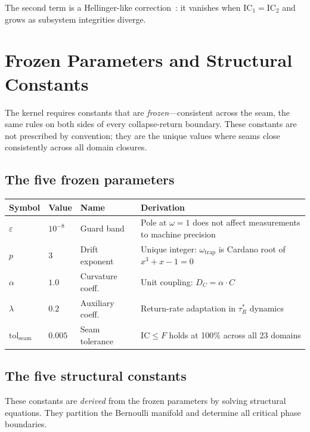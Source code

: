 \documentclass[
  aps,
  prd,
  twocolumn,
  superscriptaddress,
  nofootinbib,
  floatfix
]{revtex4-2}
\newcommand{\tRS}{\tau_{\!R}^{*}}
\newcommand{\eps}{\varepsilon}
\newcommand{\tolseam}{\mathrm{tol}_{\mathrm{seam}}}
\newcommand{\IC}{\mathrm{IC}}
\begin{document}
\noindent The second term is a Hellinger-like
correction~\cite{hellinger1909}: it vanishes when
$\IC_1 = \IC_2$ and grows as subsystem integrities diverge.


\section{Frozen Parameters and Structural Constants}
\label{sec:frozen}

The kernel requires constants that are \emph{frozen}---consistent
across the seam, the same rules on both sides of every
collapse-return boundary.  These constants are not prescribed by
convention; they are the unique values where seams close
consistently across all domain closures.

\subsection{The five frozen parameters}

\begin{center}
{\small\begin{tabular}{@{}lllp{3.2cm}@{}}
\toprule
\textbf{Symbol} & \textbf{Value} & \textbf{Name} & \textbf{Derivation} \\
\midrule
$\eps$ & $10^{-8}$ & Guard band & Pole at $\omega=1$ does not affect measurements to machine precision \\
$p$ & $3$ & Drift exponent & Unique integer: $\omega_{\mathrm{trap}}$ is Cardano root of $x^3+x-1=0$ \\
$\alpha$ & $1.0$ & Curvature coeff.\ & Unit coupling: $D_C = \alpha \cdot C$ \\
$\lambda$ & $0.2$ & Auxiliary coeff.\ & Return-rate adaptation in $\tRS$ dynamics \\
$\tolseam$ & $0.005$ & Seam tolerance & $\IC \leq F$ holds at 100\% across all 23 domains \\
\bottomrule
\end{tabular}}
\end{center}

\subsection{The five structural constants}

These constants are \emph{derived} from the frozen parameters by
solving structural equations.  They partition the Bernoulli manifold
and determine all critical phase boundaries.
\end{document}
